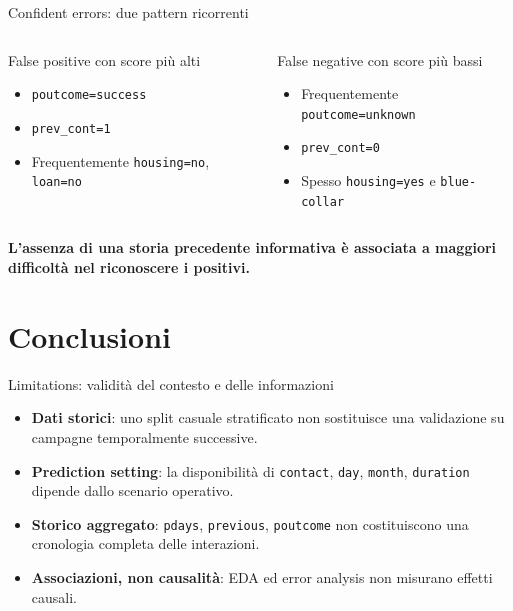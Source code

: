 \documentclass[10pt,aspectratio=169]{beamer}
\newcommand{\keypoint}[1]{\par\vspace{0.45em}\noindent{\color{teal}\rule{2.4pt}{1.25em}}\hspace{0.7em}\parbox[t]{0.92\linewidth}{\raggedright\textbf{#1}}}
\newcommand{\tightitems}{\setlength{\itemsep}{.5em}}
\begin{document}
\begin{frame}{Confident errors: due pattern ricorrenti}
\begin{columns}[T,onlytextwidth]
\begin{block}{False positive con score più alti}
\begin{itemize}\tightitems
\item \texttt{poutcome=success}
\item \texttt{prev\_cont=1}
\item Frequentemente \texttt{housing=no}, \texttt{loan=no}
\end{itemize}
\end{block}
\begin{block}{False negative con score più bassi}
\begin{itemize}\tightitems
\item Frequentemente \texttt{poutcome=unknown}
\item \texttt{prev\_cont=0}
\item Spesso \texttt{housing=yes} e \texttt{blue-collar}
\end{itemize}
\end{block}
\end{columns}
\vspace{.8em}
\keypoint{L'assenza di una storia precedente informativa è associata a maggiori difficoltà nel riconoscere i positivi.}
\end{frame}

\section{Conclusioni}

\begin{frame}{Limitations: validità del contesto e delle informazioni}
\begin{itemize}\setlength{\itemsep}{1.05em}
\item \textbf{Dati storici}: uno split casuale stratificato non sostituisce una validazione su campagne temporalmente successive.
\item \textbf{Prediction setting}: la disponibilità di \texttt{contact}, \texttt{day}, \texttt{month}, \texttt{duration} dipende dallo scenario operativo.
\item \textbf{Storico aggregato}: \texttt{pdays}, \texttt{previous}, \texttt{poutcome} non costituiscono una cronologia completa delle interazioni.
\item \textbf{Associazioni, non causalità}: EDA ed error analysis non misurano effetti causali.
\end{itemize}
\end{frame}
\end{document}
